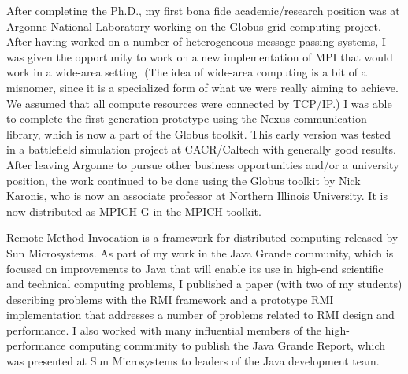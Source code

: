 {
After completing the Ph.D., my first bona fide academic/research position was at Argonne National Laboratory working on the Globus grid computing project. After having worked on a number of heterogeneous message-passing systems, I was given the opportunity to work on a new implementation of MPI that would work in a wide-area setting. (The idea of wide-area computing is a bit of a misnomer, since it is a specialized form of what we were really aiming to achieve. We assumed that all compute resources were connected by TCP/IP.) I was able to complete the first-generation prototype using the Nexus communication library, which is now a part of the Globus toolkit. This early version was tested in a battlefield simulation project at CACR/Caltech with generally good results.
\vspace{5pt}
\\
After leaving Argonne to pursue other business opportunities and/or a university position, the work continued to be done using the Globus toolkit by Nick Karonis, who is now an associate professor at Northern Illinois University. It is now distributed as MPICH-G in the MPICH toolkit.}

\begin{refsection}
    \nocite{ian_foster_wide-area_1998}
    \nocite{ian_foster_technologies_1997}
    \nocite{ian_foster_computational_1998}
    \printbibliography[heading=none]
\end{refsection}



{
Remote Method Invocation is a framework for distributed computing released by Sun Microsystems. As part of my work in the Java Grande community, which is focused on improvements to Java that will enable its use in high-end scientific and technical computing problems, I published a paper (with two of my students) describing problems with the RMI framework and a prototype RMI implementation that addresses a number of problems related to RMI design and performance. I also worked with many influential members of the high-performance computing community to publish the Java Grande Report, which was presented at Sun Microsystems to leaders of the Java development team.
}

\begin{refsection}
    \printbibliography[heading=none]
    \nocite{george_k._thiruvathukal_reflective_1998}
\end{refsection}


